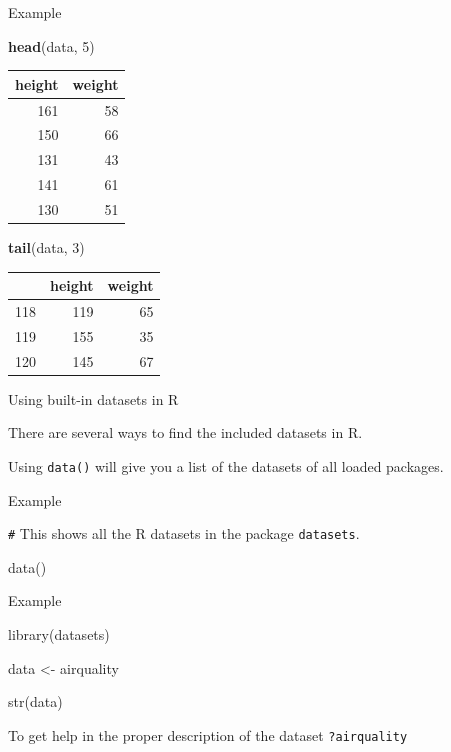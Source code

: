 \documentclass[
  ignorenonframetext,
]{beamer}
\newenvironment{Shaded}{\begin{snugshade}}{\end{snugshade}}
\newcommand{\DecValTok}[1]{\textcolor[rgb]{0.00,0.00,0.81}{#1}}
\newcommand{\KeywordTok}[1]{\textcolor[rgb]{0.13,0.29,0.53}{\textbf{#1}}}
\newcommand{\NormalTok}[1]{#1}
\begin{document}
\begin{frame}[fragile]{Example}
\protect\hypertarget{example-10}{}

\begin{Shaded}
\begin{Highlighting}[]
\KeywordTok{head}\NormalTok{(data, }\DecValTok{5}\NormalTok{)}
\end{Highlighting}
\end{Shaded}

\begin{longtable}[]{@{}rr@{}}
\toprule
height & weight\tabularnewline
\midrule
\endhead
161 & 58\tabularnewline
150 & 66\tabularnewline
131 & 43\tabularnewline
141 & 61\tabularnewline
130 & 51\tabularnewline
\bottomrule
\end{longtable}

\begin{Shaded}
\begin{Highlighting}[]
\KeywordTok{tail}\NormalTok{(data, }\DecValTok{3}\NormalTok{)}
\end{Highlighting}
\end{Shaded}

\begin{longtable}[]{@{}lrr@{}}
\toprule
& height & weight\tabularnewline
\midrule
\endhead
118 & 119 & 65\tabularnewline
119 & 155 & 35\tabularnewline
120 & 145 & 67\tabularnewline
\bottomrule
\end{longtable}

\end{frame}

\begin{frame}[fragile]{Using built-in datasets in R}
\protect\hypertarget{using-built-in-datasets-in-r}{}

There are several ways to find the included datasets in R.

Using \texttt{data()} will give you a list of the datasets of all loaded
packages.

\begin{block}{Example}

\texttt{\#} This shows all the R datasets in the package
\texttt{datasets}.

data()

\end{block}

\begin{block}{Example}

library(datasets)

data \textless- airquality

str(data)

To get help in the proper description of the dataset
\texttt{?airquality}

\end{block}

\end{frame}
\end{document}
